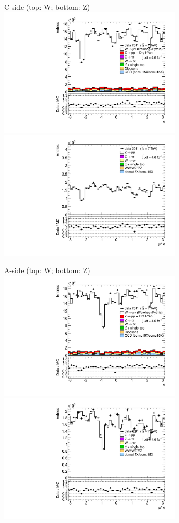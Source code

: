 {

\colb[T]

C-side (top: W; bottom: Z)
\centering
\includegraphics[width=0.66\textwidth]{dates/20130306/figures/etaphi/W_6_C_stack_l_phi_POS} \\
\includegraphics[width=0.66\textwidth]{dates/20130306/figures/etaphi/Z_6_C_stack_lP_phi_ALL.pdf}

A-side (top: W; bottom: Z)
\centering
\includegraphics[width=0.66\textwidth]{dates/20130306/figures/etaphi/W_6_A_stack_l_phi_POS} \\
\includegraphics[width=0.66\textwidth]{dates/20130306/figures/etaphi/Z_6_A_stack_lP_phi_ALL.pdf} 

\cole
}


